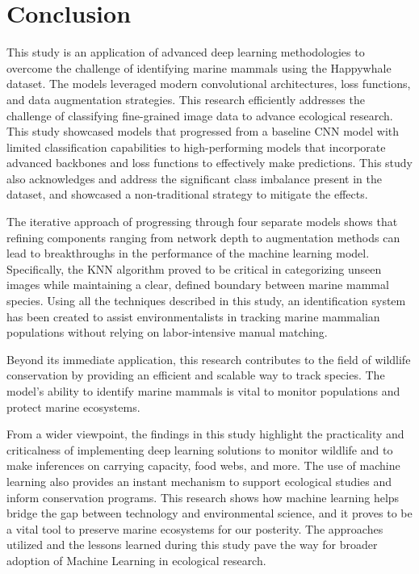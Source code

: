 \documentclass[twocolumn]{article}
\begin{document}
\section{Conclusion}

This study is an application of advanced deep learning methodologies to overcome the challenge of identifying marine mammals using the Happywhale dataset. The models leveraged modern convolutional architectures, loss functions, and data augmentation strategies. This research efficiently addresses the challenge of classifying fine-grained image data to advance ecological research. This study showcased models that progressed from a baseline CNN model with limited classification capabilities to high-performing models that incorporate advanced backbones and loss functions to effectively make predictions. This study also acknowledges and address the significant class imbalance present in the dataset, and showcased a non-traditional strategy to mitigate the effects.  

The iterative approach of progressing through four separate models shows that refining components ranging from network depth to augmentation methods can lead to breakthroughs in the performance of the machine learning model. Specifically, the KNN algorithm proved to be critical in categorizing unseen images while maintaining a clear, defined boundary between marine mammal species. Using all the techniques described in this study, an identification system has been created to assist environmentalists in tracking marine mammalian populations without relying on labor-intensive manual matching.

Beyond its immediate application, this research contributes to the field of wildlife conservation by providing an efficient and scalable way to track species. The model's ability to identify marine mammals is vital to monitor populations and protect marine ecosystems.

From a wider viewpoint, the findings in this study highlight the practicality and criticalness of implementing deep learning solutions to monitor wildlife and to make inferences on carrying capacity, food webs, and more. The use of machine learning also provides an instant mechanism to support ecological studies and inform conservation programs. This research shows how machine learning helps bridge the gap between technology and environmental science, and it proves to be a vital tool to preserve marine ecosystems for our posterity. The approaches utilized and the lessons learned during this study pave the way for broader adoption of Machine Learning in ecological research. 
\end{document}
